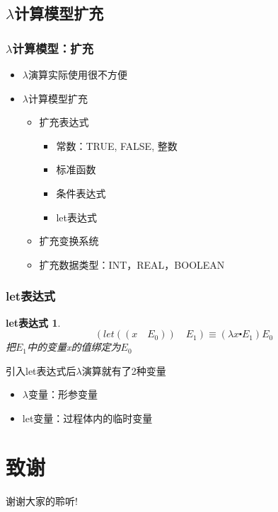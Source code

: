 \documentclass[CJKutf8,compress,hyperref]{beamer}
\begin{document}
\begin{CJK}{UTF8}{song}
\subsection{$\lambda$计算模型扩充}
\begin{frame}
  \frametitle{$\lambda$计算模型：扩充}
  \begin{itemize}
  \item $\lambda$演算实际使用很不方便 
  \item $\lambda$计算模型扩充
    \begin{itemize}
    \item 扩充表达式
      \begin{itemize}
      \item 常数：TRUE, FALSE, 整数
      \item 标准函数 
      \item 条件表达式
      \item let表达式
      \end{itemize}
    \item 扩充变换系统 
    \item 扩充数据类型：INT，REAL，BOOLEAN
    \end{itemize}
  \end{itemize}
\end{frame}

\begin{frame}
  \frametitle{let表达式} 
  \newtheorem{letE}{let表达式} 
  \begin{letE}
    \begin{displaymath}
      (let ((x \quad E_0)) \quad E_1) \equiv (\lambda x \centerdot E_1) E_0  
    \end{displaymath} 
    把$E_1$中的变量x的值绑定为$E_0$
  \end{letE}
  引入let表达式后$\lambda$演算就有了2种变量 
  \begin{itemize}
  \item $\lambda$变量：形参变量 
  \item let变量：过程体内的临时变量
  \end{itemize}
\end{frame} 

\section{致谢}
\begin{frame}
  \begin{Huge}
    \begin{center}
      谢谢大家的聆听!
    \end{center}
  \end{Huge}
\end{frame}
 
\end{CJK}
\end{document}
